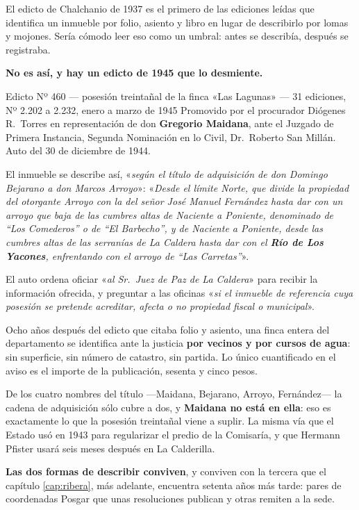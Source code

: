 El edicto de Chalchanio de 1937 es el primero de las ediciones leídas que identifica un inmueble por folio,
asiento y libro en lugar de describirlo por lomas y mojones. Sería cómodo leer eso como un
umbral: antes se describía, después se registraba.

\textbf{No es así, y hay un edicto de 1945 que lo desmiente.}

\begin{ficha}{Edicto Nº 460 --- posesión treintañal de la finca «Las Lagunas» --- 31 ediciones, Nº 2.202 a 2.232, enero a marzo de 1945}
Promovido por el procurador Diógenes R.\ Torres en representación de don \textbf{Gregorio
Maidana}, ante el Juzgado de Primera Instancia, Segunda Nominación en lo Civil, Dr.\ Roberto
San Millán. Auto del 30 de diciembre de 1944.

El inmueble se describe así, «\textit{según el título de adquisición de don Domingo Bejarano a
don Marcos Arroyo}»: «\textit{Desde el límite Norte, que divide la propiedad del otorgante
Arroyo con la del señor José Manuel Fernández hasta dar con un arroyo que baja de las cumbres
altas de Naciente a Poniente, denominado de ``Los Comederos'' o de ``El Barbecho'', y de
Naciente a Poniente, desde las cumbres altas de las serranías de La Caldera hasta dar con el
\textbf{Río de Los Yacones}, enfrentando con el arroyo de ``Las Carretas''}».

El auto ordena oficiar «\textit{al Sr.\ Juez de Paz de La Caldera}» para recibir la información
ofrecida, y preguntar a las oficinas «\textit{si el inmueble de referencia cuya posesión se
pretende acreditar, afecta o no propiedad fiscal o municipal}».
\end{ficha}

Ocho años después del edicto que citaba folio y asiento, una finca entera del departamento se
identifica ante la justicia \textbf{por vecinos y por cursos de agua}: sin superficie, sin
número de catastro, sin partida. Lo único cuantificado en el aviso es el importe de la
publicación, sesenta y cinco pesos.

De los cuatro nombres del título ---Maidana, Bejarano, Arroyo, Fernández--- la cadena de
adquisición sólo cubre a dos, y \textbf{Maidana no está en ella}: eso es exactamente lo que la
posesión treintañal viene a suplir. La misma vía que el Estado usó en 1943 para regularizar el
predio de la Comisaría, y que Hermann Pfister usará seis meses después
en La Calderilla.

\textbf{Las dos formas de describir conviven}, y conviven con la tercera que el capítulo
\ref{cap:ribera}, más adelante, encuentra setenta años más tarde: pares de coordenadas Posgar que unas
resoluciones publican y otras remiten a la sede.

